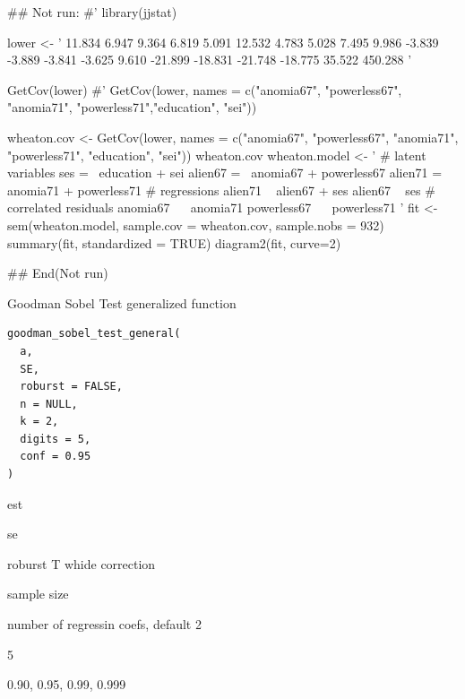\documentclass[a4paper]{book}
\begin{document}
\begin{Examples}
\begin{ExampleCode}

\#\# Not run: 
#'
library(jjstat)

lower <- '
 11.834
  6.947   9.364
  6.819   5.091  12.532
  4.783   5.028   7.495   9.986
 -3.839  -3.889  -3.841  -3.625  9.610
-21.899 -18.831 -21.748 -18.775 35.522 450.288 '

GetCov(lower)
#' GetCov(lower, names = c("anomia67", "powerless67", "anomia71", "powerless71","education", "sei"))

wheaton.cov <-
  GetCov(lower, names = c("anomia67", "powerless67",
                          "anomia71", "powerless71",
                          "education", "sei"))
wheaton.cov
wheaton.model <- '
  # latent variables
    ses     =~ education + sei
    alien67 =~ anomia67 + powerless67
    alien71 =~ anomia71 + powerless71
  # regressions
    alien71 ~ alien67 + ses
    alien67 ~ ses
  # correlated residuals
    anomia67 ~~ anomia71
    powerless67 ~~ powerless71
'
fit <- sem(wheaton.model,
           sample.cov = wheaton.cov,
           sample.nobs = 932)
summary(fit, standardized = TRUE)
diagram2(fit, curve=2)

## End(Not run)


\end{ExampleCode}
\end{Examples}
%
\begin{Description}
Goodman Sobel Test generalized function
\end{Description}
%
\begin{Usage}
\begin{verbatim}
goodman_sobel_test_general(
  a,
  SE,
  roburst = FALSE,
  n = NULL,
  k = 2,
  digits = 5,
  conf = 0.95
)
\end{verbatim}
\end{Usage}
%
\begin{Arguments}
\begin{ldescription}
\item[\code{a}] est

\item[\code{SE}] se

\item[\code{roburst}] roburst T whide correction

\item[\code{n}] sample size

\item[\code{k}] number of regressin coefs, default 2

\item[\code{digits}] 5

\item[\code{conf}] 0.90, 0.95, 0.99, 0.999
\end{ldescription}
\end{Arguments}
\end{document}
